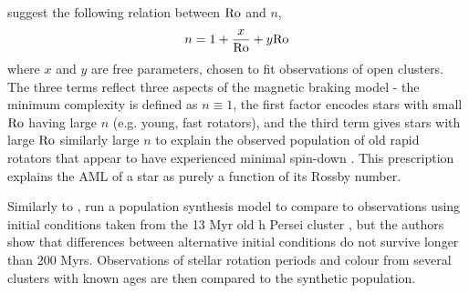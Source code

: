 \citet{garraffo2018a} suggest the following relation between $\rm Ro$ and $n$,
\begin{equation}
    \label{eqn:introduction:garraffo field complexity}
    n = 1 + \frac{x}{\rm Ro} + y {\rm Ro}
\end{equation}
where $x$ and $y$ are free parameters, chosen to fit observations of open clusters. The three terms reflect three aspects of the magnetic braking model - the minimum complexity is defined as $n \equiv 1$, the first factor encodes stars with small $\rm Ro$ having large $n$ (e.g. young, fast rotators), and the third term gives stars with large $\rm Ro$ similarly large $n$ to explain the observed population of old rapid rotators that appear to have experienced minimal spin-down \citep{vanSaders2016}. 
This prescription explains the AML of a star as purely a function of its Rossby number.

Similarly to \citet{matt2015}, \citet{garraffo2018a} run a population synthesis model to compare to observations using initial conditions taken from the 13 Myr old h Persei cluster \citep{moraux2013}, but the authors show that differences between alternative initial conditions do not survive longer than 200 Myrs. Observations of stellar rotation periods and colour from several clusters with known ages are then compared to the synthetic population.

